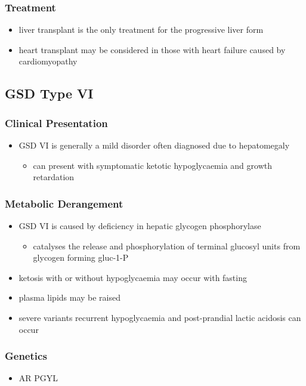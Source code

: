 \documentclass{scrartcl}
\begin{document}
\subsubsection{Treatment}
\label{sec:orge13e9f5}
\begin{itemize}
\item liver transplant is the only treatment for the progressive liver form
\item heart transplant may be considered in those with heart failure caused by cardiomyopathy
\end{itemize}
\subsection{GSD Type VI}
\label{sec:org98c6525}
\subsubsection{Clinical Presentation}
\label{sec:orgb3fd025}
\begin{itemize}
\item GSD VI is generally a mild disorder often diagnosed due to hepatomegaly
\begin{itemize}
\item can present with symptomatic ketotic hypoglycaemia and growth retardation
\end{itemize}
\end{itemize}
\subsubsection{Metabolic Derangement}
\label{sec:org9b4c901}
\begin{itemize}
\item GSD VI is caused by deficiency in hepatic glycogen phosphorylase
\begin{itemize}
\item catalyses the release and phosphorylation of terminal glucosyl units
from glycogen forming gluc-1-P
\end{itemize}
\item ketosis with or without hypoglycaemia may occur with fasting
\item plasma lipids may be raised
\item severe variants recurrent hypoglycaemia and post-prandial lactic
acidosis can occur
\end{itemize}
\subsubsection{Genetics}
\label{sec:org732457f}
\begin{itemize}
\item AR PGYL
\end{itemize}
\end{document}
